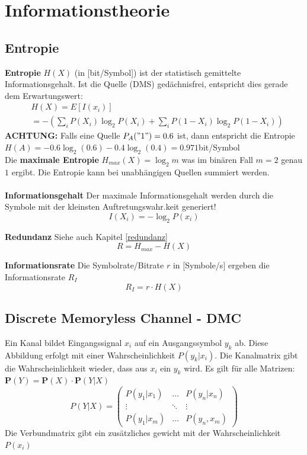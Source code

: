 \section{Informationstheorie}
\subsection{Entropie}\label{entropie}
 \textbf{Entropie} $H(X)$ (in [bit/Symbol]) ist der statistisch gemittelte Informationsgehalt. Ist die Quelle (DMS) gedächnisfrei, entspricht dies gerade dem Erwartungswert:
\begin{align*}
	&H(X) = E[I(x_i)] \\
	&= -\left(\sum_{i}P(X_i)\log_2P(X_i) + \sum_{i}P(1-X_i)\log_2P(1-X_i)\right)
\end{align*}
\textbf{ACHTUNG:} Falls eine Quelle $P_A("1") = 0.6$ ist, dann entspricht die Entropie $H(A) = -0.6\log_2(0.6) - 0.4\log_2(0.4) = 0.971$bit/Symbol~\\

Die \textbf{maximale Entropie} $H_{max}(X) = \log_2 m$ was im binären Fall $m=2$ genau $1$ ergibt. Die Entropie kann bei unabhängigen Quellen summiert werden.~\\~\\

\textbf{Informationsgehalt} Der maximale Informationsgehalt werden durch die Symbole mit der kleinsten Auftretungswahr.keit generiert!
\[
I(X_i) = -\log_2P(x_i)
\]

\textbf{Redundanz} Siehe auch Kapitel \ref{redundanz}
\[
R = H_{max} - H(X)
\]

\textbf{Informationsrate}
Die Symbolrate/Bitrate $r$ in [Symbole/s] ergeben die Informationsrate $R_I$
\[
R_I = r\cdot H(X)
\]

\subsection{Discrete Memoryless Channel - DMC}
Ein Kanal bildet Eingangssignal $x_i$ auf ein Ausgangssymbol $y_k$ ab. Diese Abbildung erfolgt mit einer Wahrscheinlichkeit $P(y_k | x_i)$.
Die Kanalmatrix gibt die Wahrscheinlichkeit wieder, dass aus $x_i$ ein $y_k$ wird. Es gilt für alle Matrizen: $\mathbf{P}(Y) = \mathbf{P}(X) \cdot \mathbf{P}(Y|X)$
\[
P(Y|X) = \begin{pmatrix}
	P(y_1|x_1) & \dots & P(y_n|x_n) \\
	\vdots & \ddots & \vdots \\
	P(y_1|x_m) & \dots & P(y_n,x_m)
\end{pmatrix}
\]
Die Verbundmatrix gibt ein zusätzliches gewicht mit der Wahrscheinlichkeit $P(x_i)$

